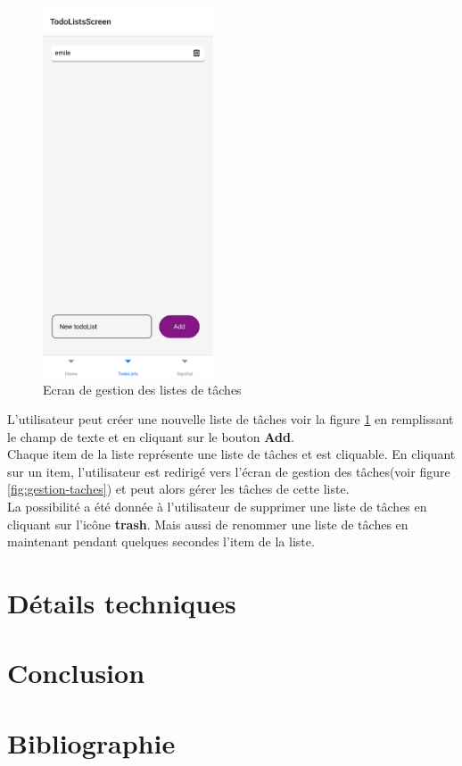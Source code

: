 \documentclass[12pt]{article}
\begin{document}
        \begin{figure}[H]
            \centering
            \includegraphics[width=0.45\textwidth]{images/taskList}
            \caption{Ecran de gestion des listes de tâches}
            \label{fig:gestion-listes}
        \end{figure}

        L'utilisateur peut créer une nouvelle liste de tâches voir la figure \ref{fig:gestion-listes} en remplissant
        le champ de texte et en cliquant sur le bouton \textbf{Add}.\\ Chaque item de la liste représente une liste de tâches
        et est cliquable. En cliquant sur un item, l'utilisateur est redirigé vers l'écran de gestion des tâches(voir figure \ref{fig:gestion-taches})
        et peut alors gérer les tâches de cette liste.\\
        La possibilité a été donnée à l'utilisateur de supprimer une liste de tâches en cliquant sur l'icône \textbf{trash}.
        Mais aussi de renommer une liste de tâches en maintenant pendant quelques secondes l'item de la liste.

        \section{Détails techniques}\label{sec:details-techniques}

        \section{Conclusion}\label{sec:conclusion}

        \section{Bibliographie}\label{sec:bibliographie}

        
\end{document}

